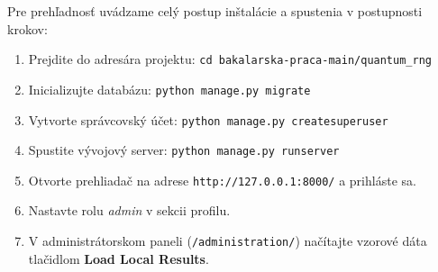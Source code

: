 Pre prehľadnosť uvádzame celý postup inštalácie a spustenia v postupnosti
krokov:

\begin{enumerate}
  \item Prejdite do adresára projektu:
  \texttt{cd bakalarska-praca-main/quantum\_rng}
  \item Inicializujte databázu:
  \texttt{python manage.py migrate}
  \item Vytvorte správcovský účet:
  \texttt{python manage.py createsuperuser}
  \item Spustite vývojový server:
  \texttt{python manage.py runserver}
  \item Otvorte prehliadač na adrese \texttt{http://127.0.0.1:8000/}
  a prihláste sa.
  \item Nastavte rolu \emph{admin} v sekcii profilu.
  \item V administrátorskom paneli (\texttt{/administration/}) načítajte
  vzorové dáta tlačidlom \textbf{Load Local Results}.
\end{enumerate}
